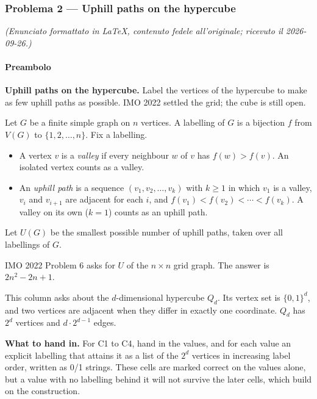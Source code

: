 \documentclass[11pt,a4paper]{article}
\providecommand{\tightlist}{\setlength{\itemsep}{0pt}\setlength{\parskip}{0pt}}
\begin{document}
\subsubsection{Problema 2 --- Uphill paths on the
hypercube}\label{problema-2-uphill-paths-on-the-hypercube}

\emph{(Enunciato formattato in LaTeX, contenuto fedele all'originale;
ricevuto il 2026-09-26.)}

\paragraph{Preambolo}\label{preambolo}

\textbf{Uphill paths on the hypercube.} Label the vertices of the
hypercube to make as few uphill paths as possible. IMO 2022 settled the
grid; the cube is still open.

Let \(G\) be a finite simple graph on \(n\) vertices. A labelling of
\(G\) is a bijection \(f\) from \(V(G)\) to \(\{1,2,\ldots,n\}\). Fix a
labelling.

\begin{itemize}
\tightlist
\item
  A vertex \(v\) is a \emph{valley} if every neighbour \(w\) of \(v\)
  has \(f(w) > f(v)\). An isolated vertex counts as a valley.
\item
  An \emph{uphill path} is a sequence \((v_1, v_2, \ldots, v_k)\) with
  \(k \ge 1\) in which \(v_1\) is a valley, \(v_i\) and \(v_{i+1}\) are
  adjacent for each \(i\), and \(f(v_1) < f(v_2) < \cdots < f(v_k)\). A
  valley on its own (\(k=1\)) counts as an uphill path.
\end{itemize}

Let \(U(G)\) be the smallest possible number of uphill paths, taken over
all labellings of \(G\).

IMO 2022 Problem 6 asks for \(U\) of the \(n \times n\) grid graph. The
answer is \(2n^2 - 2n + 1\).

This column asks about the \(d\)-dimensional hypercube \(Q_d\). Its
vertex set is \(\{0,1\}^d\), and two vertices are adjacent when they
differ in exactly one coordinate. \(Q_d\) has \(2^d\) vertices and
\(d \cdot 2^{d-1}\) edges.

\textbf{What to hand in.} For C1 to C4, hand in the values, and for each
value an explicit labelling that attains it as a list of the \(2^d\)
vertices in increasing label order, written as 0/1 strings. These cells
are marked correct on the values alone, but a value with no labelling
behind it will not survive the later cells, which build on the
construction.
\end{document}
